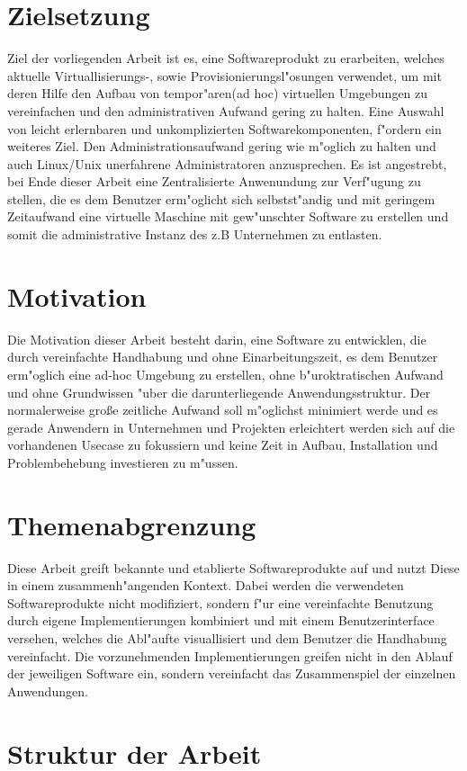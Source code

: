 \section{Zielsetzung}
Ziel der vorliegenden Arbeit ist es, eine Softwareprodukt zu erarbeiten, welches aktuelle Virtuallisierungs-, sowie Provisionierungsl"osungen verwendet, um mit deren Hilfe den Aufbau von tempor"aren(ad hoc) virtuellen Umgebungen zu vereinfachen und den administrativen Aufwand gering zu halten.\newline
Eine Auswahl von leicht erlernbaren und unkomplizierten Softwarekomponenten, f"ordern ein weiteres Ziel. Den Administrationsaufwand gering wie m"oglich zu halten und auch Linux/Unix unerfahrene Administratoren anzusprechen.\newline
Es ist angestrebt, bei Ende dieser Arbeit eine Zentralisierte Anwenundung zur Verf"ugung zu stellen, die es dem Benutzer erm"oglicht sich selbstst"andig und mit geringem Zeitaufwand eine virtuelle Maschine mit gew"unschter Software zu erstellen und somit die administrative Instanz des z.B Unternehmen zu entlasten.

\section{Motivation}
Die Motivation dieser Arbeit besteht darin, eine Software zu entwicklen, die durch vereinfachte Handhabung und ohne Einarbeitungszeit, es dem Benutzer erm"oglich eine ad-hoc Umgebung zu erstellen, ohne b"uroktratischen Aufwand und ohne Grundwissen "uber die darunterliegende Anwendungsstruktur.
Der normalerweise gro{\ss}e zeitliche Aufwand soll m"oglichst minimiert werde und es gerade Anwendern in Unternehmen und Projekten erleichtert werden sich auf die vorhandenen Usecase zu fokussiern und keine Zeit in Aufbau, Installation und Problembehebung investieren zu m"ussen.

\section{Themenabgrenzung}
Diese Arbeit greift bekannte und etablierte Softwareprodukte auf und nutzt Diese in einem zusammenh"angenden Kontext. Dabei werden die verwendeten Softwareprodukte nicht modifiziert, sondern f"ur eine vereinfachte Benutzung durch eigene Implementierungen kombiniert und mit einem Benutzerinterface versehen, welches die Abl"aufte visuallisiert und dem Benutzer die Handhabung vereinfacht.
Die vorzunehmenden Implementierungen greifen nicht in den Ablauf der jeweiligen Software ein, sondern vereinfacht das Zusammenspiel der einzelnen Anwendungen.

\section{Struktur der Arbeit}

